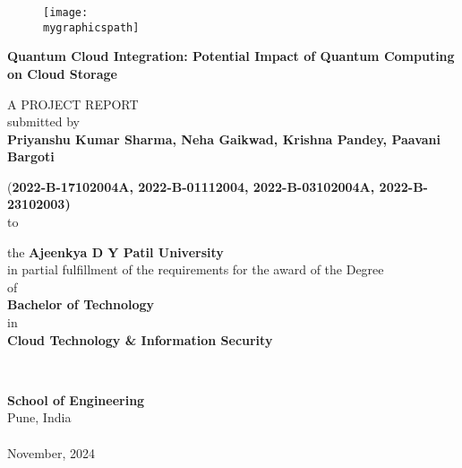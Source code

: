 \documentclass[12pt,a4paper]{article}
\newcommand{\mygraphicspath}{D:/SEM-5/FSDC/quantum-cloud-integration/images/ADYPU_LOGO.png}
\newcommand{\vname}{Priyanshu Kumar Sharma, Neha Gaikwad, Krishna Pandey, Paavani Bargoti}
\newcommand{\vregisternumber}{2022-B-17102004A, 2022-B-01112004, 2022-B-03102004A, 2022-B-23102003}
\newcommand{\vspecialization}{Cloud Technology \& Information Security}
\newcommand{\vdate}{November, 2024}
\newcommand{\vcollege}{Ajeenkya D Y Patil University}
\newcommand{\vtitle}{Quantum Cloud Integration: Potential Impact of Quantum Computing on Cloud Storage}
\newcommand{\department}{School of Engineering}
\newcommand{\vaddresslinei}{Pune, India}
\begin{document}
\thispagestyle{empty}
\begin{center}
    {\begin{figure}[!h]
        \centering
        \texttt{[image: \\mygraphicspath]}
    \end{figure}}


    {\large {\bfseries {\vtitle} \par}}


    \vspace{3\baselineskip}
    
    A PROJECT REPORT\\[0.5cm]
submitted by\\[0.5cm]
    {\fontsize{14}{20}\selectfont \bfseries \vname}

{(\bfseries \vregisternumber)}
\quad\\
to
\begin{spacing}{1.25}
the \textbf{\vcollege}\\

in partial fulfillment of the requirements for the award of the Degree\\
of\\
\textbf{Bachelor of Technology}\\
in\\
\textbf{\vspecialization}
\end{spacing}
%
\quad\\[0.5cm]

\begin{spacing}{1.25}
{\fontsize{14}{20}\selectfont\bfseries \department }\\

\vaddresslinei\\
\vaddresslineii\\
{\fontsize{12}{20}\selectfont \vdate}\\
\end{spacing}
\end{center}
\newpage
\end{document}
